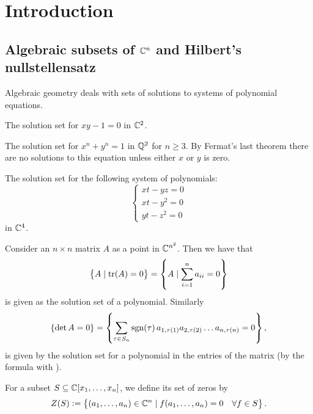 \documentclass[11pt,a4paper]{article}
\begin{document}
\maketitle


\newpage
\tableofcontents
\newpage

\section{Introduction}

\subsection{Algebraic subsets of \texorpdfstring{$\mathbb{C}^n$}{C} and Hilbert's nullstellensatz}

Algebraic geometry deals with sets of solutions to systems of polynomial
equations.

\begin{example}
  The solution set for $xy - 1 = 0$ in $\mathbb{C}^2$.
\end{example}
\begin{example}
  The solution set for $x^n + y^n = 1$ in $\mathbb{Q}^2$ for $n \geq 3$.
  By Fermat's last theorem there are no solutions to this equation
  unless either $x$ or $y$ is zero.
\end{example}
\begin{example}
  The solution set for the following system of polynomials:
  \[
    \begin{cases}
      xt - yz = 0 \\
      xt - y^2 = 0 \\
      yt - z^2 = 0
    \end{cases}
  \]
  in $\mathbb{C}^4$.
\end{example}

\begin{example}
  Consider an $n \times n$ matrix $A$ as a point in $\mathbb{C}^{n^2}$.
  Then we have that
  \[
    \left\{A \mid \operatorname{tr}(A) = 0\right\} =
    \left\{A \mid \sum_{i=1}^{n} a_{ii} = 0\right\}
  \]
  is given as the solution set of a polynomial.
  Similarly
  \[
    \left\{\det A = 0\right\} = \left\{\sum_{\tau \in S_n}\operatorname{sgn}(\tau)\,a_{1,\tau(1)}a_{2,\tau(2)} \ldots a_{n,\tau(n)} = 0\right\},
  \]
  is given by the solution set for a polynomial in the entries
  of the matrix (by the formula with ). %
\end{example}

\begin{definition}
  For a subset $S \subseteq \mathbb{C}[x_1,\dots,x_n]$,
  we define its set of zeros by
  \[
    Z(S) :=
    \left\{(a_1,\dots,a_n) \in \mathbb{C}^n \mid f(a_1,\dots,a_n) = 0 \quad \forall f \in S\right\}.
  \]
\end{definition}
\end{document}

